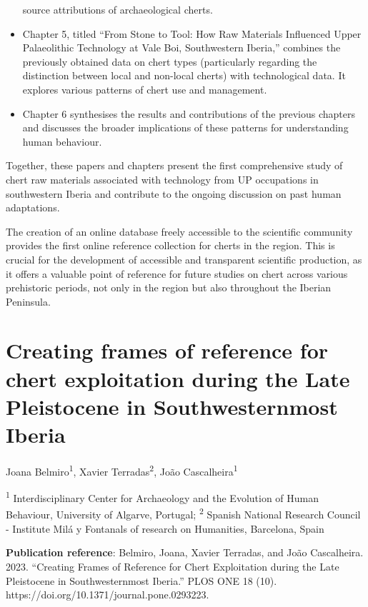 \documentclass[
  a4paper,
  DIV=11,
  numbers=noendperiod]{scrreprt}
\begin{document}
\begin{itemize}
  source attributions of archaeological cherts.
\item
  Chapter 5, titled ``From Stone to Tool: How Raw Materials Influenced
  Upper Palaeolithic Technology at Vale Boi, Southwestern Iberia,''
  combines the previously obtained data on chert types (particularly
  regarding the distinction between local and non-local cherts) with
  technological data. It explores various patterns of chert use and
  management.
\item
  Chapter 6 synthesises the results and contributions of the previous
  chapters and discusses the broader implications of these patterns for
  understanding human behaviour.
\end{itemize}

Together, these papers and chapters present the first comprehensive
study of chert raw materials associated with technology from UP
occupations in southwestern Iberia and contribute to the ongoing
discussion on past human adaptations.

The creation of an online database freely accessible to the scientific
community provides the first online reference collection for cherts in
the region. This is crucial for the development of accessible and
transparent scientific production, as it offers a valuable point of
reference for future studies on chert across various prehistoric
periods, not only in the region but also throughout the Iberian
Peninsula.


\chapter{Creating frames of reference for chert exploitation during the
Late Pleistocene in Southwesternmost
Iberia}\label{creating-frames-of-reference-for-chert-exploitation-during-the-late-pleistocene-in-southwesternmost-iberia}

Joana Belmiro\textsuperscript{1}, Xavier Terradas\textsuperscript{2},
João Cascalheira\textsuperscript{1}

\textsuperscript{1} Interdisciplinary Center for Archaeology and the
Evolution of Human Behaviour, University of Algarve, Portugal;
\textsuperscript{2} Spanish National Research Council - Institute Milá y
Fontanals of research on Humanities, Barcelona, Spain

\textbf{Publication reference}: Belmiro, Joana, Xavier Terradas, and
João Cascalheira. 2023. ``Creating Frames of Reference for Chert
Exploitation during the Late Pleistocene in Southwesternmost Iberia.''
PLOS ONE 18 (10). https://doi.org/10.1371/journal.pone.0293223.
\end{document}
